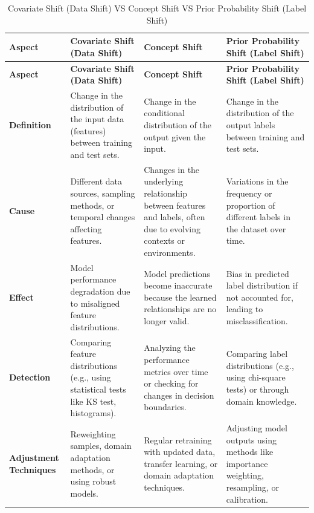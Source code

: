 \begin{longtable}{|m{3.5cm}|m{4cm}|m{4cm}|m{4cm}|}
    \caption{Covariate Shift (Data Shift) VS Concept Shift VS Prior Probability Shift (Label Shift)} \\ \hline
    
    \textbf{Aspect} & \textbf{Covariate Shift (Data Shift)} & \textbf{Concept Shift} & \textbf{Prior Probability Shift (Label Shift)} \\ \hline
    \endfirsthead
    
    \textbf{Aspect} & \textbf{Covariate Shift (Data Shift)} & \textbf{Concept Shift} & \textbf{Prior Probability Shift (Label Shift)} \\ \hline
    \endhead
    
    \hline\endfoot
    
    \hline\endlastfoot
    
    \textbf{Definition} & Change in the distribution of the input data (features) between training and test sets. & Change in the conditional distribution of the output given the input. & Change in the distribution of the output labels between training and test sets. \\ \hline
    
    \textbf{Cause} & Different data sources, sampling methods, or temporal changes affecting features. & Changes in the underlying relationship between features and labels, often due to evolving contexts or environments. & Variations in the frequency or proportion of different labels in the dataset over time. \\ \hline

    \textbf{Effect} & Model performance degradation due to misaligned feature distributions. & Model predictions become inaccurate because the learned relationships are no longer valid. & Bias in predicted label distribution if not accounted for, leading to misclassification. \\ \hline

    \textbf{Detection} & Comparing feature distributions (e.g., using statistical tests like KS test, histograms). & Analyzing the performance metrics over time or checking for changes in decision boundaries. & Comparing label distributions (e.g., using chi-square tests) or through domain knowledge. \\ \hline

    \textbf{Adjustment Techniques} & Reweighting samples, domain adaptation methods, or using robust models. & Regular retraining with updated data, transfer learning, or domain adaptation techniques. & Adjusting model outputs using methods like importance weighting, resampling, or calibration. \\ \hline


\end{longtable}
